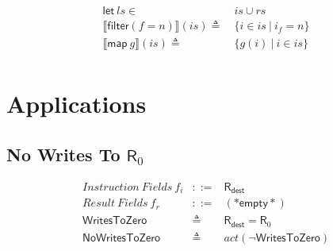\documentclass[12pt, letterpaper]{article}
\newcommand\interp[1]{\llbracket #1 \rrbracket}
\begin{document}
    \begin{align*}
        \mathsf{let}\ ls \in\ & is\cup rs\\
        \interp{\mathsf{filter}(f=n)}(is)
            \triangleq\ & \{i \in is\ |\ i_f = n\}\\
        \interp{\mathsf{map}\ g}(is)
        \triangleq\ &
        \{ g(i)\ |\ i\in is \} \\
    \end{align*}

\section{Applications}

\subsection{No Writes To $\mathsf{R}_0$}

 \[
 \begin{array}{rcl}
   \mathit{Instruction\ Fields}\ f_i &::=& \mathsf{R}_{\mathsf{dest}} \\
   \mathit{Result\ Fields}\ f_r &::=& \mathsf{(*empty*)}\\
   \mathsf{WritesToZero} &\triangleq& \mathsf{R}_{\mathsf{dest}} = \mathsf{R}_0 \\
   \mathsf{NoWritesToZero} &\triangleq& \mathit{act}(\neg\mathsf{WritesToZero})
 \end{array}
 \]
 
\end{document}
